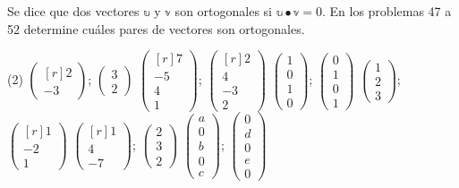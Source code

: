 Se dice que dos vectores $\mathbb{u}$ y $\mathbb{v}$ son ortogonales si $\mathbb{u} \bullet \mathbb{v}=0$. En los problemas 47 a 52 determine cuáles pares de vectores son ortogonales.
\begin{tasks}[
    start=47,
    style=enumerate,
    label-offset = 3mm,
    ](2)
    \task $\begin{pmatrix*}[r]2 \\ -3\end{pmatrix*}$; $\begin{pmatrix*}3 \\ 2\end{pmatrix*}$
    \task $\begin{pmatrix*}[r]7 \\ -5 \\ 4 \\ 1\end{pmatrix*}$; $\begin{pmatrix*}[r]2 \\ 4 \\ -3 \\ 2\end{pmatrix*}$
    \task $\begin{pmatrix} 1 \\ 0 \\ 1 \\ 0 \end{pmatrix}$; $\begin{pmatrix} 0 \\ 1 \\ 0 \\ 1 \end{pmatrix}$
    \task $\begin{pmatrix*}1 \\ 2 \\ 3\end{pmatrix*}$; $\begin{pmatrix*}[r]1 \\ -2 \\ 1\end{pmatrix*}$
    \task $\begin{pmatrix*}[r]1 \\ 4 \\ -7\end{pmatrix*}$; $\begin{pmatrix*}2 \\ 3 \\ 2\end{pmatrix*}$
    \task $\begin{pmatrix*}a \\ 0 \\ b \\ 0 \\ c\end{pmatrix*}$; $\begin{pmatrix*}0 \\ d \\ 0 \\ e \\ 0\end{pmatrix*}$
\end{tasks}
